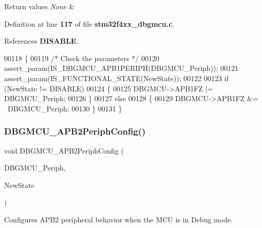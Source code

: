 \begin{DoxyRetVals}{Return values}
{\em None} & \\
\hline
\end{DoxyRetVals}


Definition at line \textbf{ 117} of file \textbf{ stm32f4xx\+\_\+dbgmcu.\+c}.



References \textbf{ D\+I\+S\+A\+B\+LE}.


\begin{DoxyCode}
00118 \{
00119   \textcolor{comment}{/* Check the parameters */}
00120   assert_param(IS_DBGMCU_APB1PERIPH(DBGMCU\_Periph));
00121   assert_param(IS_FUNCTIONAL_STATE(NewState));
00122 
00123   \textcolor{keywordflow}{if} (NewState != DISABLE)
00124   \{
00125     DBGMCU->APB1FZ |= DBGMCU\_Periph;
00126   \}
00127   \textcolor{keywordflow}{else}
00128   \{
00129     DBGMCU->APB1FZ &= ~DBGMCU\_Periph;
00130   \}
00131 \}
\end{DoxyCode}
\mbox{\label{group__DBGMCU_ga2f5ed438cada1be09ea51c42419be3a8}} 
\subsubsection{D\+B\+G\+M\+C\+U\+\_\+\+A\+P\+B2\+Periph\+Config()}
{\footnotesize\ttfamily void D\+B\+G\+M\+C\+U\+\_\+\+A\+P\+B2\+Periph\+Config (\begin{DoxyParamCaption}\item[{uint32\+\_\+t}]{D\+B\+G\+M\+C\+U\+\_\+\+Periph,  }\item[{\textbf{ Functional\+State}}]{New\+State }\end{DoxyParamCaption})}



Configures A\+P\+B2 peripheral behavior when the M\+CU is in Debug mode. 


